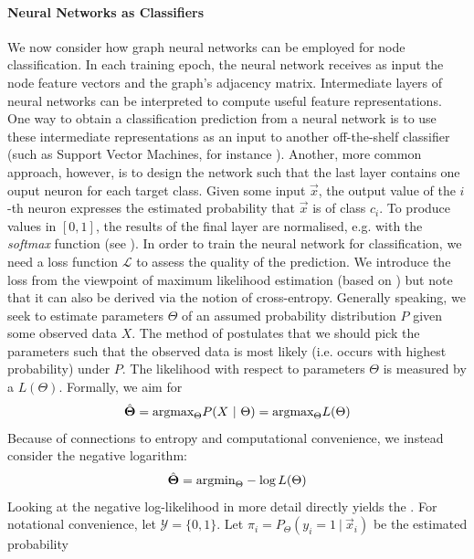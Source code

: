 \documentclass[
	fontsize=10pt, %
	twoside=false, %
	secnumdepth=1, %
  toc=indentunnumbered %
]{kaobook}
\begin{document}
\paragraph{Neural Networks as Classifiers} We now consider how graph neural
networks can be employed for node classification. In each training epoch, the
neural network receives as input the node feature vectors and the graph's
adjacency matrix.
%
Intermediate layers of neural
networks can be interpreted to compute useful feature representations. One way
to obtain a classification prediction from a neural network is to use these
intermediate representations as an input to another off-the-shelf classifier
(such as Support Vector Machines, for instance
\cite{liu_CombiningConvolutionalNeural_2018}). Another, more common approach,
however, is to design the network such that the last layer contains one ouput
neuron for each target class. Given some input $\vec x$, the output value of the
$i$-th neuron expresses the estimated probability that $\vec x$ is of class
$c_i$. To produce values in $[0,1]$, the results of the final layer are
normalised, e.g. with the \textit{softmax} function (see ).
%
In order to train the neural network for classification, we need a loss function
$\mathcal{L}$ to assess the quality of the prediction. We introduce the
 loss from the viewpoint of maximum likelihood
estimation (based on \cite{zhang_dive_nodate}) but note that it can also be
derived via the notion of cross-entropy.
%
Generally speaking, we seek to estimate parameters $\Theta$ of an assumed
probability distribution $P$ given some observed data $X$. The method of
 postulates that we should pick the
parameters such that the observed data is most likely (i.e. occurs with highest
probability) under $P$. The likelihood with respect to parameters $\Theta$ is measured by
a  $L(\Theta)$.
Formally, we aim for
\begin{align}
  \hat \Theta = \argmax_\Theta P(X~|~\Theta) = \argmax_\Theta L(\Theta)
\end{align}
Because of connections to entropy and computational convenience, we instead
consider the negative logarithm:
\begin{align}
  \hat \Theta = \argmin_\Theta -\log L(\Theta)
\end{align}
Looking at the negative log-likelihood in more detail directly yields the
.
For notational convenience, let $\mathcal{Y} =
\{0,1\}$. Let $\pi_i = P_\Theta(y_i=1~|~\vec x_i)$ be the estimated probability
\end{document}
